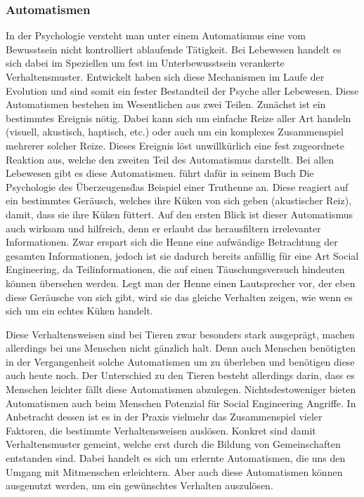 \subsubsection{Automatismen}\label{sec:automatismen}
In der Psychologie versteht man unter einem Automatismus eine vom Bewusstsein nicht kontrolliert ablaufende Tätigkeit. \cite{duden}
Bei Lebewesen handelt es sich dabei im Speziellen um fest im Unterbewusstsein verankerte Verhaltensmuster.
Entwickelt haben sich diese Mechanismen im Laufe der Evolution und sind somit ein fester Bestandteil der Psyche aller Lebewesen.
Diese Automatismen bestehen im Wesentlichen aus zwei Teilen. Zunächst ist ein bestimmtes Ereignis nötig. Dabei kann sich um einfache Reize aller Art handeln (visuell, akustisch, haptisch, etc.) oder auch um ein
komplexes Zusammenspiel mehrerer solcher Reize.
Dieses Ereignis löst unwillkürlich eine fest zugeordnete Reaktion aus, welche den zweiten Teil des Automatismus darstellt.
Bei allen Lebewesen gibt es diese Automatismen.  führt dafür in seinem Buch \"Die Psychologie des Überzeugens\" das Beispiel einer Truthenne an. Diese reagiert auf ein bestimmtes Geräusch, welches ihre Küken von sich geben (akustischer Reiz), damit, dass sie ihre Küken füttert.
Auf den ersten Blick ist dieser Automatismus auch wirksam und hilfreich, denn er erlaubt das herausfiltern irrelevanter Informationen.
Zwar erspart sich die Henne eine aufwändige Betrachtung der gesamten Informationen, jedoch ist sie dadurch bereits anfällig für eine Art Social Engineering, da Teilinformationen, die auf einen Täuschungsversuch hindeuten können übersehen werden.
Legt man der Henne einen Lautsprecher vor, der eben diese Geräusche von sich gibt, wird sie das gleiche Verhalten zeigen, wie wenn es sich um ein echtes Küken handelt.

Diese Verhaltensweisen sind bei Tieren zwar besonders stark ausgeprägt, machen allerdings bei uns Menschen nicht gänzlich halt.
Denn auch Menschen benötigten in der Vergangenheit solche Automatismen um zu überleben und benötigen diese auch heute noch.
Der Unterschied zu den Tieren besteht allerdings darin, dass es Menschen leichter fällt diese Automatismen abzulegen.
Nichtsdestoweniger bieten Automatismen auch beim Menschen Potenzial für Social Engineering Angriffe.
In Anbetracht dessen ist es in der Praxis vielmehr das Zusammenspiel vieler Faktoren, die bestimmte Verhaltensweisen auslösen. Konkret sind damit Verhaltensmuster gemeint, welche erst durch die Bildung von Gemeinschaften entstanden sind. Dabei handelt es sich um erlernte Automatismen, die uns den Umgang mit Mitmenschen erleichtern. Aber auch diese Automatismen können ausgenutzt werden, um ein gewünschtes Verhalten auszulösen. \cite{cialdini}


